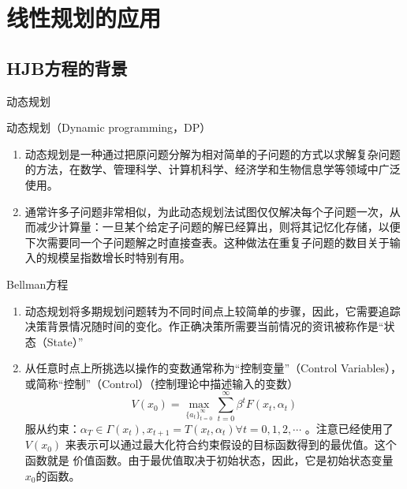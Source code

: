 \section{线性规划的应用}
\subsection{HJB方程的背景} 


\begin{frame}{动态规划}
\small 
\begin{block}{动态规划（Dynamic programming，DP）}
\begin{enumerate}
\item 动态规划是一种通过把原问题分解为相对简单的子问题的方式以求解复杂问题的方法，在数学、管理科学、计算机科学、经济学和生物信息学等领域中广泛使用。\\
\item 通常许多子问题非常相似，为此动态规划法试图仅仅解决每个子问题一次，从而减少计算量：一旦某个给定子问题的解已经算出，则将其记忆化存储，以便下次需要同一个子问题解之时直接查表。这种做法在重复子问题的数目关于输入的规模呈指数增长时特别有用。
\end{enumerate}
\end{block}

\pause 
\begin{block}{Bellman方程}
\begin{enumerate}
\item 动态规划将多期规划问题转为不同时间点上较简单的步骤，因此，它需要追踪决策背景情况随时间的变化。作正确决策所需要当前情况的资讯被称作是“状态（State）”\\
\item 从任意时点上所挑选以操作的变数通常称为“控制变量”（Control Variables），或简称“控制”（Control）（控制理论中描述输入的变数）\\
$$
V(x_0)=\max_{\{a_t\}^{\infty }_{t=0}}\sum^{\infty}_{t=0}\beta^tF(x_t,\alpha_t)
$$
服从约束：$\alpha_T\in \Gamma(x_t),x_{t+1}=T(x_t,\alpha_t)\forall t=0,1,2,\cdots$
。注意已经使用了$V(x_{0})$ 来表示可以通过最大化符合约束假设的目标函数得到的最优值。这个函数就是 价值函数。由于最优值取决于初始状态，因此，它是初始状态变量$x_{0}$的函数。
\end{enumerate}
\end{block}
\end{frame}


